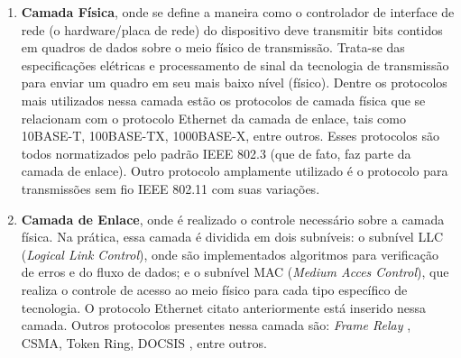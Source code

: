 \documentclass[	12pt, Times, openright, twoside, a4paper, english, brazil]{abntex2}
\begin{document}
\begin{enumerate}
\item \textbf{Camada Física}, onde se define a maneira como o controlador de interface de rede (o hardware/placa de rede) do dispositivo deve transmitir bits contidos em quadros de dados sobre o meio físico de transmissão. Trata-se das especificações elétricas e processamento de sinal da tecnologia de transmissão para enviar um quadro em seu mais baixo nível (físico). Dentre os protocolos mais utilizados nessa camada estão os protocolos de camada física que se relacionam com o protocolo Ethernet da camada de enlace, tais como 10BASE-T, 100BASE-TX, 1000BASE-X, entre outros. Esses protocolos são todos normatizados pelo padrão IEEE 802.3 \cite{ieee8023} (que de fato, faz parte da camada de enlace). Outro protocolo amplamente utilizado é o protocolo para transmissões sem fio IEEE 802.11 \cite{ieee80211} com suas variações.

\item \textbf{Camada de Enlace}, onde é realizado o controle necessário sobre a camada física. Na prática, essa camada é dividida em dois subníveis: o subnível LLC (\textit{Logical Link Control}), onde são implementados algoritmos para verificação de erros e do fluxo de dados; e o subnível MAC (\textit{Medium Acces Control}), que realiza o controle de acesso ao meio físico para cada tipo específico de tecnologia. O protocolo Ethernet citato anteriormente \cite{ieee8023} está inserido nessa camada. Outros protocolos presentes nessa camada são: \textit{Frame Relay} \cite{RFC1596}, CSMA, Token Ring, DOCSIS \cite{docsis}, entre outros.



\end{enumerate}
\end{document}

